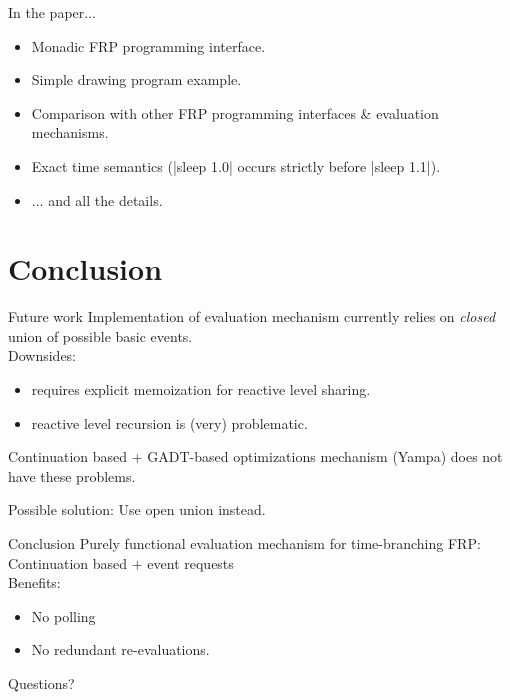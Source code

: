 \documentclass{beamer}
\begin{document}
\begin{frame}{In the paper...}
\begin{itemize}
\item Monadic FRP programming interface.
\item Simple drawing program example.
\item Comparison with other FRP programming interfaces \& evaluation mechanisms.
\item Exact time semantics (|sleep 1.0| occurs strictly before |sleep 1.1|).

\item ... and all the details.
\end{itemize}

\end{frame}

\section{Conclusion}
\begin{frame}{Future work}
Implementation of evaluation mechanism currently relies on \emph{closed} union of possible basic events.\\
Downsides:
\begin{itemize}
\item requires explicit memoization for reactive level sharing.
\item reactive level recursion is (very) problematic.
\end{itemize}
Continuation based + GADT-based optimizations mechanism (Yampa) does not have these problems.\\

\vspace{0.5cm}

Possible solution: Use open union instead.
\end{frame}









\begin{frame}{Conclusion}
\noindent Purely functional evaluation mechanism for time-branching FRP:\\
\hspace{0.5cm}Continuation based + event requests\\
Benefits:
\begin{itemize}
\item No polling
\item No redundant re-evaluations.
\end{itemize}
\pause
Questions?
\end{frame}
\end{document}
